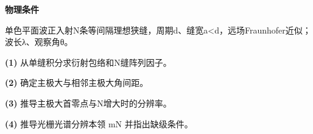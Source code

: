 \textbf{物理条件}\par 单色平面波正入射N条等间隔理想狭缝，周期d、缝宽a<d，远场Fraunhofer近似；波长λ、观察角θ。
\par\noindent\textbf{(1)} 从单缝积分求衍射包络和N缝阵列因子。
\par\noindent\textbf{(2)} 确定主极大与相邻主极大角间距。
\par\noindent\textbf{(3)} 推导主极大首零点与N增大时的分辨率。
\par\noindent\textbf{(4)} 推导光栅光谱分辨本领 mN 并指出缺级条件。
